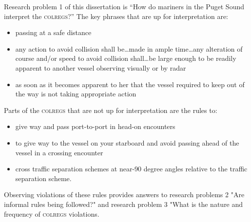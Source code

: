 \documentclass[twoside,symmetric,notoc]{tufte-book}
\begin{document}
\par{%
Research problem 1 of this dissertation is ``How do mariners in the Puget Sound interpret the \textsc{colregs}?'' 
The key phrases that are up for interpretation are:
\begin{itemize}
    \item passing at a safe distance
    \item any action to avoid collision shall be\ldots made in ample time\ldots any alteration of course and/or speed to avoid collision shall\ldots be large enough to be readily apparent to another vessel observing visually or by radar
    \item as soon as it becomes apparent to her that the vessel required to keep out of the way is not taking appropriate action
\end{itemize}
Parts of the \textsc{colregs} that are not up for interpretation are the rules to:
\begin{itemize}
    \item give way and pass port-to-port in head-on encounters
    \item to give way to the vessel on your starboard and avoid passing ahead of the vessel in a crossing encounter
    \item cross traffic separation schemes at near-90 degree angles relative to the traffic separation scheme.
 \end{itemize}
Observing violations of these rules provides answers to research problems 2 "Are informal rules being followed?" and research problem 3 "What is the nature and frequency of \textsc{colregs} violations.
}
\end{document}
